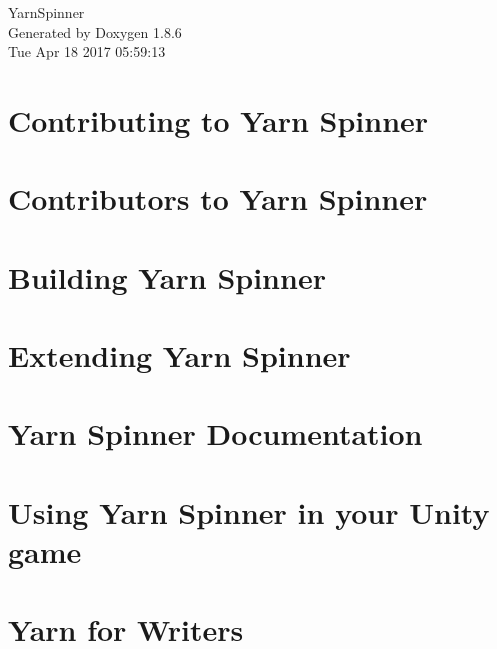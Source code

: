 \documentclass[twoside]{book}
\newcommand{\clearemptydoublepage}{%
  \newpage{\pagestyle{empty}\cleardoublepage}%
}
\begin{document}
\hypersetup{pageanchor=false}
\begin{titlepage}
\vspace*{7cm}
\begin{center}%
{\Large Yarn\-Spinner }\\
\vspace*{1cm}
{\large Generated by Doxygen 1.8.6}\\
\vspace*{0.5cm}
{\small Tue Apr 18 2017 05:59:13}\\
\end{center}
\end{titlepage}
\clearemptydoublepage
\tableofcontents
\clearemptydoublepage
{}
\hypersetup{pageanchor=true}

\chapter{Contributing to Yarn Spinner}
\label{d7/d46/a00002}
\hypertarget{d7/d46/a00002}{}

\chapter{Contributors to Yarn Spinner}
\label{d0/d0b/a00004}
\hypertarget{d0/d0b/a00004}{}

\chapter{Building Yarn Spinner}
\label{de/d21/a00006}
\hypertarget{de/d21/a00006}{}

\chapter{Extending Yarn Spinner}
\label{d4/dee/a00008}
\hypertarget{d4/dee/a00008}{}

\chapter{Yarn Spinner Documentation}
\label{d7/dec/a00010}
\hypertarget{d7/dec/a00010}{}

\chapter{Using Yarn Spinner in your Unity game}
\label{df/d86/a00012}
\hypertarget{df/d86/a00012}{}

\chapter{Yarn for Writers}
\label{d2/de7/a00014}
\hypertarget{d2/de7/a00014}{}

\end{document}
